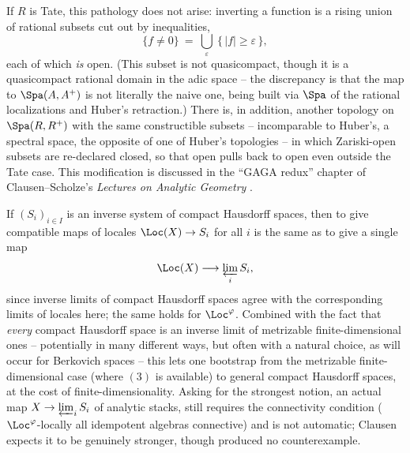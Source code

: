 \begin{remark}
\label{rmk:22:tate-fix}
If $R$ is Tate, this pathology does not arise: inverting a function is a rising
union of rational subsets cut out by inequalities,
\begin{equation*}
\{f\neq0\}\ =\ \bigcup_{\varepsilon}\ \{\,|f|\ge\varepsilon\,\},
\end{equation*}
each of which \emph{is} open. (This subset is not quasicompact, though it is a
quasicompact rational domain in the adic space -- the discrepancy is that the
map to $\Spa(A,A^+)$ is not literally the naive one, being built via
$\Spa$ of the rational localizations and Huber's retraction.) There is, in
addition, another topology on $\Spa(R,R^+)$ with the same constructible subsets
-- incomparable to Huber's, a spectral space, the opposite of one of Huber's
topologies -- in which Zariski-open subsets are re-declared closed, so that
open pulls back to open even outside the Tate case. This modification is
discussed in the ``GAGA redux'' chapter of Clausen--Scholze's
\emph{Lectures on Analytic Geometry} \cite{clausen2020analytic}.
\end{remark}

\begin{remark}
\label{rmk:22:inverse-limits}
If $(S_i)_{i\in I}$ is an inverse system of compact Hausdorff spaces, then to
give compatible maps of locales $\Loc(X)\to S_i$ for all $i$ is the same as to
give a single map
\begin{equation*}
\Loc(X)\longrightarrow \varprojlim_i S_i ,
\end{equation*}
since inverse limits of compact Hausdorff spaces agree with the corresponding
limits of locales here; the same holds for $\Loc^{\varphi}$. Combined with the
fact that \emph{every} compact Hausdorff space is an inverse limit of
metrizable finite-dimensional ones -- potentially in many different ways, but
often with a natural choice, as will occur for Berkovich spaces -- this lets
one bootstrap from the metrizable finite-dimensional case (where $(3)$ is
available) to general compact Hausdorff spaces, at the cost of
finite-dimensionality. Asking for the strongest notion, an actual map
$X\to\varprojlim_i S_i$ of analytic stacks, still requires the connectivity
condition ($\Loc^{\varphi}$-locally all idempotent algebras connective) and is
not automatic; Clausen expects it to be genuinely stronger, though produced no
counterexample.
\end{remark}

